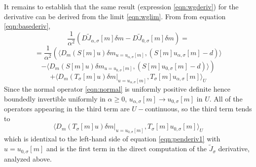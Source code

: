 It remains to establish that the same result (expression
\ref{eqn:wgderiv}) for the derivative can be derived from the
limit \ref{eqn:wglim}. From from equation \ref{eqn:basederiv},
\[
  \frac{1}{\alpha^2}(D \tilde{J}_{\alpha,\sigma}[m] \delta m - D
  \tilde{J}_{0,\sigma}[m]\delta m) =
\]
\[
  = \frac{1}{\alpha^2} \left(\langle D_m(S[m]u)\delta m_{u =  u_{\alpha,\sigma}[m]}, (S[m]u_{\alpha,\sigma}[m]-d) \rangle\right.
\]
\[
  - \left.\langle D_m(S[m]u)\delta m_{u =  u_{0,\sigma}[m]}, (S[m]u_{0,\sigma}[m]-d) \rangle\right)
\]
\begin{equation}
  \label{eqn:limdiff}
  +  \langle D_m(T_{\sigma}[m]u)\delta
  m|_{u=u_{\alpha,\sigma}[m]},T_{\sigma}[m]u_{\alpha,\sigma}[m]\rangle_U
\end{equation}
Since the normal operator \ref{eqn:normal} is uniformly positive
definite hence boundedly invertible uniformly in $\alpha \ge 0$,
$u_{\alpha,\sigma}[m] \rightarrow u_{0,\sigma}[m]$ in $U$. All of the
operators appearing in the third term are $U-$continuous, so  the
third term tends to
\[
  \langle D_m(T_{\sigma}[m]u)\delta
  m|_{u=u_{0,\sigma}[m]},T_{\sigma}[m]u_{0,\sigma}[m]\rangle_U
\]
which is identixal to the left-hand side of equation
\ref{eqn:penderiv1} with $u=u_{0,\sigma}[m]$ and is the first term in the direct computation of
the $\tilde{J}_{\sigma}$ derivative, analyzed above.

